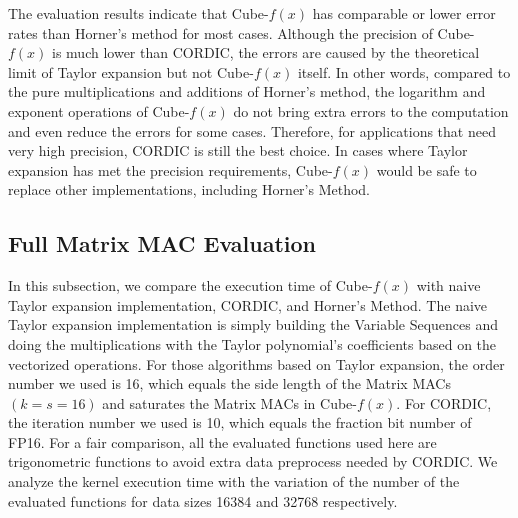 \documentclass[12pt]{extbook}
\begin{document}
The evaluation results indicate that Cube-$f(x)$ has comparable or lower error rates than Horner's method for most cases. Although the precision of Cube-$f(x)$ is much lower than CORDIC, the errors are caused by the theoretical limit of Taylor expansion but not Cube-$f(x)$ itself. In other words, compared to the pure multiplications and additions of Horner's method, the logarithm and exponent operations of Cube-$f(x)$ do not bring extra errors to the computation and even reduce the errors for some cases. Therefore, for applications that need very high precision, CORDIC is still the best choice. In cases where Taylor expansion has met the precision requirements, Cube-$f(x)$ would be safe to replace other implementations, including Horner's Method.

\begin{figure}[htbp]
\end{figure}

\subsection{Full Matrix MAC Evaluation \label{Sec: 4.2}}

In this subsection, we compare the execution time of Cube-$f(x)$ with naive Taylor expansion implementation, CORDIC, and Horner's Method. The naive Taylor expansion implementation is simply building the Variable Sequences and doing the multiplications with the Taylor polynomial's coefficients based on the vectorized operations. For those algorithms based on Taylor expansion, the order number we used is 16, which equals the side length of the Matrix MACs $(k = s = 16)$ and saturates the Matrix MACs in Cube-$f(x)$. For CORDIC, the iteration number we used is 10, which equals the fraction bit number of FP16. For a fair comparison, all the evaluated functions used here are trigonometric functions to avoid extra data preprocess needed by CORDIC. We analyze the kernel execution time with the variation of the number of the evaluated functions for data sizes 16384 and 32768 respectively.
\end{document}
